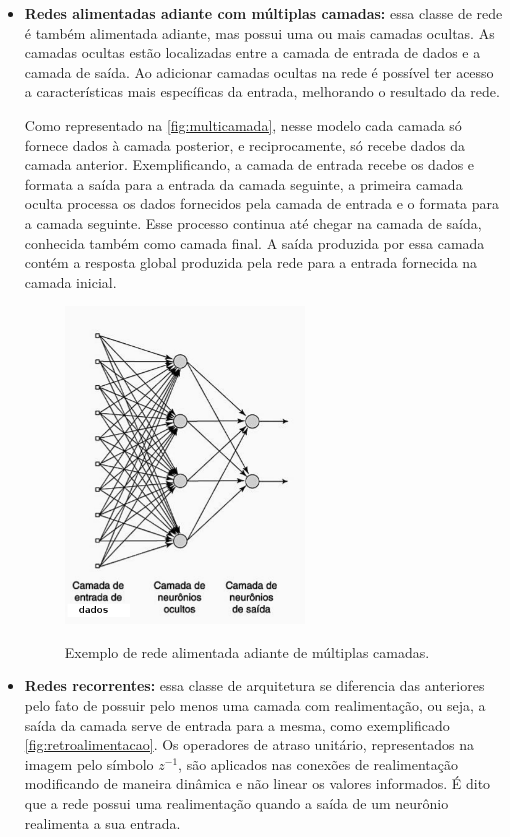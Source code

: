 \begin{itemize}
\item \textbf{Redes alimentadas adiante com múltiplas camadas:} essa classe de rede é também alimentada adiante, mas possui uma ou mais camadas ocultas. As camadas ocultas estão localizadas entre a camada de entrada de dados e a camada de saída. Ao adicionar camadas ocultas na rede é  possível ter acesso a características mais específicas da entrada, melhorando o resultado da rede.
\par Como representado na \autoref{fig:multicamada}, nesse modelo cada camada só fornece dados à camada posterior, e reciprocamente, só recebe dados da camada anterior. Exemplificando, a camada de entrada recebe os dados e formata a saída para a entrada da camada seguinte, a primeira camada oculta processa os dados fornecidos pela camada de entrada e o formata para a camada seguinte. Esse processo continua até chegar na camada de saída, conhecida também como camada final. A saída produzida por essa camada contém a resposta global produzida pela rede para a entrada fornecida na camada inicial.
\begin{figure}[H]
  \centering
  \caption{Exemplo de rede alimentada adiante de múltiplas camadas.}
  \includegraphics[width=180pt]{dados/figuras/multi_camadas}
  \label{fig:multicamada}
\end{figure}
\item \textbf{Redes recorrentes:} essa classe de arquitetura se diferencia das anteriores pelo fato de possuir pelo menos uma camada com realimentação, ou seja, a saída da camada serve de entrada para a mesma, como exemplificado \autoref{fig:retroalimentacao}. Os operadores de atraso unitário, representados na imagem pelo símbolo $z^{-1}$, são aplicados nas conexões de realimentação modificando de maneira dinâmica e não linear os valores informados. É dito que a rede possui uma realimentação quando a saída de um neurônio realimenta a sua entrada.

\end{itemize}
